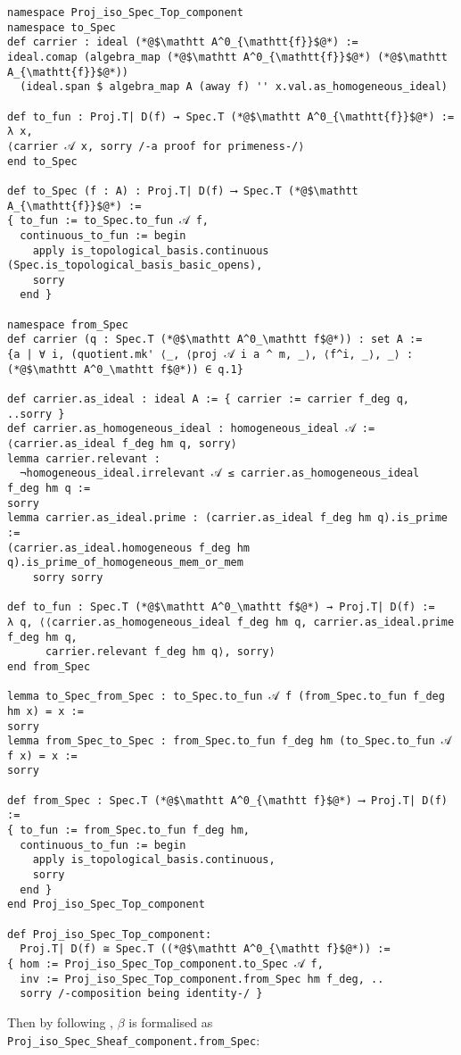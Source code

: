 \documentclass[a4paper,UKenglish,cleveref, autoref, thm-restate]{lipics-v2021}
\begin{document}
\begin{lstlisting}
namespace Proj_iso_Spec_Top_component
namespace to_Spec
def carrier : ideal (*@$\mathtt A^0_{\mathtt{f}}$@*) :=
ideal.comap (algebra_map (*@$\mathtt A^0_{\mathtt{f}}$@*) (*@$\mathtt A_{\mathtt{f}}$@*))
  (ideal.span $ algebra_map A (away f) '' x.val.as_homogeneous_ideal)

def to_fun : Proj.T| D(f) → Spec.T (*@$\mathtt A^0_{\mathtt{f}}$@*) :=
λ x,
⟨carrier 𝒜 x, sorry /-a proof for primeness-/⟩
end to_Spec

def to_Spec (f : A) : Proj.T| D(f) ⟶ Spec.T (*@$\mathtt A_{\mathtt{f}}$@*) :=
{ to_fun := to_Spec.to_fun 𝒜 f,
  continuous_to_fun := begin
    apply is_topological_basis.continuous (Spec.is_topological_basis_basic_opens),
    sorry
  end }

namespace from_Spec
def carrier (q : Spec.T (*@$\mathtt A^0_\mathtt f$@*)) : set A :=
{a | ∀ i, (quotient.mk' ⟨_, ⟨proj 𝒜 i a ^ m, _⟩, ⟨f^i, _⟩, _⟩ : (*@$\mathtt A^0_\mathtt f$@*)) ∈ q.1}

def carrier.as_ideal : ideal A := { carrier := carrier f_deg q, ..sorry }
def carrier.as_homogeneous_ideal : homogeneous_ideal 𝒜 := 
⟨carrier.as_ideal f_deg hm q, sorry⟩
lemma carrier.relevant :
  ¬homogeneous_ideal.irrelevant 𝒜 ≤ carrier.as_homogeneous_ideal f_deg hm q := 
sorry
lemma carrier.as_ideal.prime : (carrier.as_ideal f_deg hm q).is_prime :=
(carrier.as_ideal.homogeneous f_deg hm q).is_prime_of_homogeneous_mem_or_mem 
    sorry sorry

def to_fun : Spec.T (*@$\mathtt A^0_\mathtt f$@*) → Proj.T| D(f) :=
λ q, ⟨⟨carrier.as_homogeneous_ideal f_deg hm q, carrier.as_ideal.prime f_deg hm q,
      carrier.relevant f_deg hm q⟩, sorry⟩ 
end from_Spec

lemma to_Spec_from_Spec : to_Spec.to_fun 𝒜 f (from_Spec.to_fun f_deg hm x) = x := 
sorry
lemma from_Spec_to_Spec : from_Spec.to_fun f_deg hm (to_Spec.to_fun 𝒜 f x) = x :=
sorry

def from_Spec : Spec.T (*@$\mathtt A^0_{\mathtt f}$@*) ⟶ Proj.T| D(f) :=
{ to_fun := from_Spec.to_fun f_deg hm,
  continuous_to_fun := begin
    apply is_topological_basis.continuous,
    sorry
  end }
end Proj_iso_Spec_Top_component

def Proj_iso_Spec_Top_component:
  Proj.T| D(f) ≅ Spec.T ((*@$\mathtt A^0_{\mathtt f}$@*)) :=
{ hom := Proj_iso_Spec_Top_component.to_Spec 𝒜 f,
  inv := Proj_iso_Spec_Top_component.from_Spec hm f_deg, ..
  sorry /-composition being identity-/ }
\end{lstlisting}
Then by following , $\beta$ is formalised as \lstinline{Proj_iso_Spec_Sheaf_component.from_Spec}:
\end{document}
